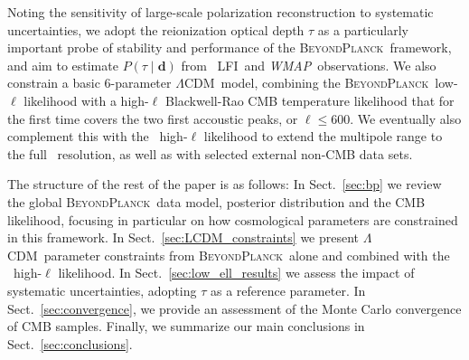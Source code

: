 \documentclass[onecolumn]{aa}
\def\WMAP{\textit{WMAP}}
\def\LCDM{$\Lambda$CDM}
\newcommand{\BP}{\textsc{BeyondPlanck}}
\newcommand{\lfi}[0]{LFI}
\begin{document}
Noting the sensitivity of large-scale polarization reconstruction 
to systematic uncertainties, we adopt the reionization optical depth $\tau$ as a
particularly important probe of stability and performance of the
\BP\ framework, and aim to estimate $P(\tau\mid\mathbf{d})$ from
\Planck\ \lfi\ and \WMAP\ observations. We also constrain a basic
$6$-parameter \LCDM\ model, combining the \BP\ low-$\ell$ likelihood
with a high-$\ell$ Blackwell-Rao CMB temperature likelihood that for
the first time covers the two first accoustic peaks, or
$\ell\le600$. We eventually also complement this with the
\Planck\ high-$\ell$ likelihood to extend the multipole range to the
full \Planck\ resolution, as well as with selected external non-CMB data
sets.

The structure of the rest of the paper is as follows: In
Sect.~\ref{sec:bp} we review the global \BP\ data model, posterior
distribution and the CMB likelihood, focusing in particular on how
cosmological parameters are constrained in this framework. In
Sect.~\ref{sec:LCDM_constraints} we present \LCDM\ parameter
constraints from \BP\ alone and combined with the \Planck\ high-$\ell$
likelihood. In Sect.~\ref{sec:low_ell_results} we assess the impact
of systematic uncertainties, adopting $\tau$ as a reference
parameter. In Sect.~\ref{sec:convergence}, we provide an assessment of
the Monte Carlo convergence of CMB samples. Finally, we summarize our
main conclusions in Sect.~\ref{sec:conclusions}.
\end{document}
